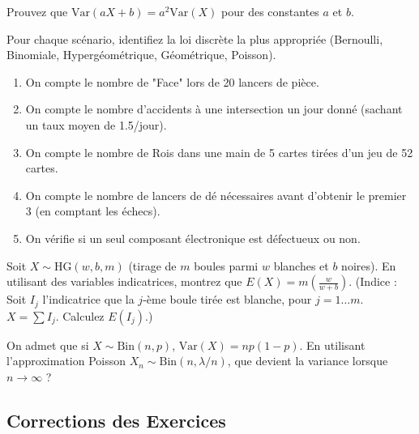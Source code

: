 \begin{exercicebox}
Prouvez que $\text{Var}(aX + b) = a^2 \text{Var}(X)$ pour des constantes $a$ et $b$.
\end{exercicebox}


\begin{exercicebox}
Pour chaque scénario, identifiez la loi discrète la plus appropriée (Bernoulli, Binomiale, Hypergéométrique, Géométrique, Poisson).
\begin{enumerate}
    \item On compte le nombre de "Face" lors de 20 lancers de pièce.
    \item On compte le nombre d'accidents à une intersection un jour donné (sachant un taux moyen de 1.5/jour).
    \item On compte le nombre de Rois dans une main de 5 cartes tirées d'un jeu de 52 cartes.
    \item On compte le nombre de lancers de dé nécessaires avant d'obtenir le premier 3 (en comptant les échecs).
    \item On vérifie si un seul composant électronique est défectueux ou non.
\end{enumerate}
\end{exercicebox}

\begin{exercicebox}
Soit $X \sim \text{HG}(w, b, m)$ (tirage de $m$ boules parmi $w$ blanches et $b$ noires).
En utilisant des variables indicatrices, montrez que $E(X) = m \left( \frac{w}{w+b} \right)$.
(Indice : Soit $I_j$ l'indicatrice que la $j$-ème boule tirée est blanche, pour $j=1 \dots m$. $X = \sum I_j$. Calculez $E(I_j)$.)
\end{exercicebox}

\begin{exercicebox}
On admet que si $X \sim \text{Bin}(n, p)$, $\text{Var}(X) = np(1-p)$.
En utilisant l'approximation Poisson $X_n \sim \text{Bin}(n, \lambda/n)$, que devient la variance lorsque $n \to \infty$ ?
\end{exercicebox}



\subsection{Corrections des Exercices}

